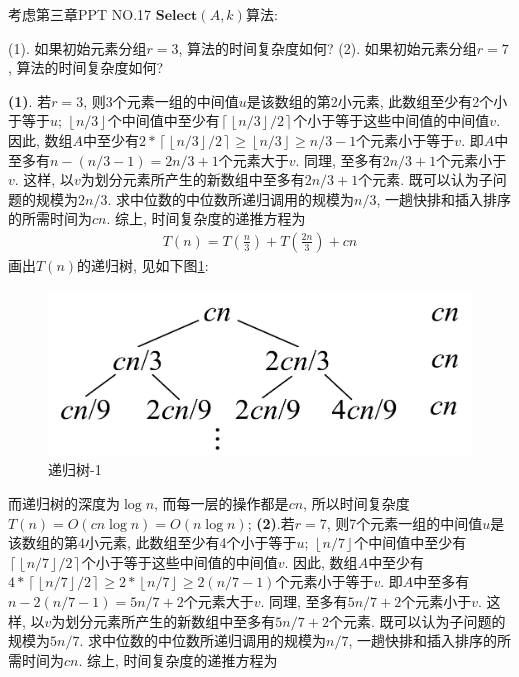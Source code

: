 \documentclass{article}
\begin{document}
\pagebreak

\begin{homeworkProblem}
	考虑第三章PPT NO.17 $\textbf{Select}(A,k)$算法: 

	(1). 如果初始元素分组$r=3$, 算法的时间复杂度如何?
	(2). 如果初始元素分组$r=7$, 算法的时间复杂度如何?


	\solution
	

	\textbf{(1)}. 若$r=3$, 则3个元素一组的中间值$u$是该数组的第$2$小元素, 此数组至少有2个小于等于$u$; $\left\lfloor n/3\right\rfloor $个中间值中至少有$\left\lceil \left\lfloor n/3\right\rfloor /2\right\rceil $个小于等于这些中间值的中间值$v$. 因此, 数组$A$中至少有$2\ast \left\lceil \left\lfloor n/3\right\rfloor /2\right\rceil \geq \left\lfloor n/3\right\rfloor \geq n/3-1$个元素小于等于$v$. 即$A$中至多有$n-(n/3-1)=2n/3+1$个元素大于$v$. 同理, 至多有$2n/3+1$个元素小于$v$. 这样, 以$v$为划分元素所产生的新数组中至多有$2n/3+1$个元素. 既可以认为子问题的规模为$2n/3$. 求中位数的中位数所递归调用的规模为$n/3$, 一趟快排和插入排序的所需时间为$cn$. 综上, 时间复杂度的递推方程为
	\begin{align}
		T\left( n \right) =T\left( \frac{n}{3} \right) +T\left( \frac{2n}{3} \right) +cn
	\end{align}
	画出$T(n)$的递归树, 见如下图\ref{fig:递归树-1}:
	\begin{figure}[H]  %
		\centering
		\includegraphics[width=0.4\linewidth]{images/title/递归树1.pdf}
		\caption{递归树-1}
		\label{fig:递归树-1}
	\end{figure}
	而递归树的深度为$\log n$, 而每一层的操作都是$cn$, 所以时间复杂度$T(n)=O(cn\log n)=O(n\log n)$;
	\textbf{(2)}.若$r=7$, 则7个元素一组的中间值$u$是该数组的第$4$小元素, 此数组至少有4个小于等于$u$; $\left\lfloor n/7\right\rfloor $个中间值中至少有$\left\lceil \left\lfloor n/7\right\rfloor /2\right\rceil $个小于等于这些中间值的中间值$v$. 因此, 数组$A$中至少有$4\ast \left\lceil \left\lfloor n/7\right\rfloor /2\right\rceil \geq 2\ast \left\lfloor n/7\right\rfloor \geq 2(n/7-1)$个元素小于等于$v$. 即$A$中至多有$n-2(n/7-1)=5n/7+2$个元素大于$v$. 同理, 至多有$5n/7+2$个元素小于$v$. 这样, 以$v$为划分元素所产生的新数组中至多有$5n/7+2$个元素. 既可以认为子问题的规模为$5n/7$. 求中位数的中位数所递归调用的规模为$n/7$, 一趟快排和插入排序的所需时间为$cn$. 综上, 时间复杂度的递推方程为
	\begin{align}

\end{align}
\end{homeworkProblem}
\end{document}

